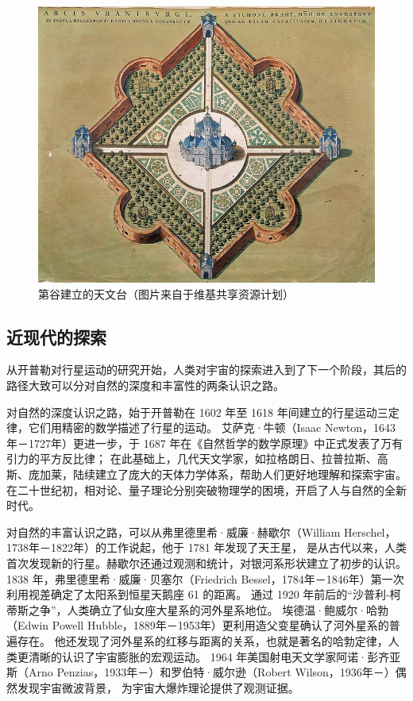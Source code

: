 \documentclass[a4paper,10.5pt]{book}
\begin{document}
\begin{figure}[ht]
\centering
\includegraphics[width=5.0in]{images/1_09-Uraniborgskiss.jpg}
\caption{第谷建立的天文台（图片来自于维基共享资源计划）}
\end{figure}

\subsection{近现代的探索}

从开普勒对行星运动的研究开始，人类对宇宙的探索进入到了下一个阶段，其后的路径大致可以分对自然的深度和丰富性的两条认识之路。

对自然的深度认识之路，始于开普勒在 1602 年至 1618 年间建立的行星运动三定律，它们用精密的数学描述了行星的运动。
艾萨克·牛顿（Isaac Newton，1643年－1727年）更进一步，于 1687 年在《自然哲学的数学原理》中正式发表了万有引力的平方反比律；
在此基础上，几代天文学家，如拉格朗日、拉普拉斯、高斯、庞加莱，陆续建立了庞大的天体力学体系，帮助人们更好地理解和探索宇宙。
在二十世纪初，相对论、量子理论分别突破物理学的困境，开启了人与自然的全新时代。

对自然的丰富认识之路，可以从弗里德里希·威廉·赫歇尔（William Herschel，1738年－1822年）的工作说起，他于 1781 年发现了天王星，
是从古代以来，人类首次发现新的行星。赫歇尔还通过观测和统计，对银河系形状建立了初步的认识。
1838 年，弗里德里希·威廉·贝塞尔（Friedrich Bessel，1784年－1846年）第一次利用视差确定了太阳系到恒星天鹅座 61 的距离。
通过 1920 年前后的“沙普利-柯蒂斯之争”，人类确立了仙女座大星系的河外星系地位。
埃德温·鲍威尔·哈勃（Edwin Powell Hubble，1889年－1953年）更利用造父变星确认了河外星系的普遍存在。
他还发现了河外星系的红移与距离的关系，也就是著名的哈勃定律，人类更清晰的认识了宇宙膨胀的宏观运动。
1964 年美国射电天文学家阿诺·彭齐亚斯（Arno Penzias，1933年－）和罗伯特·威尔逊（Robert Wilson，1936年－）偶然发现宇宙微波背景，
为宇宙大爆炸理论提供了观测证据。
\end{document}
